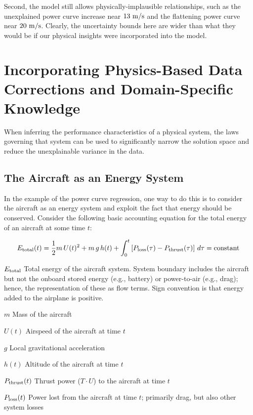 Second, the model still allows physically-implausible relationships, such as the unexplained power curve increase near $13\ \rm m/s$ and the flattening power curve near $20\ \rm m/s$. Clearly, the uncertainty bounds here are wider than what they would be if our physical insights were incorporated into the model.


\section{Incorporating Physics-Based Data Corrections and Domain-Specific Knowledge}
\label{sec:physics_based_corrections}

When inferring the performance characteristics of a physical system, the laws governing that system can be used to significantly narrow the solution space and reduce the unexplainable variance in the data.

\subsection{The Aircraft as an Energy System}

In the example of the power curve regression, one way to do this is to consider the aircraft as an energy system and exploit the fact that energy should be conserved. Consider the following basic accounting equation for the total energy of an aircraft at some time $t$:

\begin{equation}
    E_{\rm total}(t) =
    \frac{1}{2}m \, U(t)^2
    + m \, g \, h(t)
    + \int_0^t \left[
        P_{\rm loss}(\tau)
        - P_{\rm thrust}(\tau)
        \right] \, d\tau = \text{constant}
    \label{eq:total_energy}
\end{equation}

\begin{eqexpl}
    \item{$E_{\rm total}$} Total energy of the aircraft system. System boundary includes the aircraft but not the onboard stored energy (e.g., battery) or power-to-air (e.g., drag); hence, the representation of these as flow terms. Sign convention is that energy added to the airplane is positive.
    \item{$m$} Mass of the aircraft
    \item{$U(t)$} Airspeed of the aircraft at time $t$
    \item{$g$} Local gravitational acceleration
    \item{$h(t)$} Altitude of the aircraft at time $t$
    \item{$P_{\rm thrust}(t)$} Thrust power ($T \cdot U$) to the aircraft at time $t$
    \item{$P_{\rm loss}(t)$} Power lost from the aircraft at time $t$; primarily drag, but also other system losses
\end{eqexpl}

